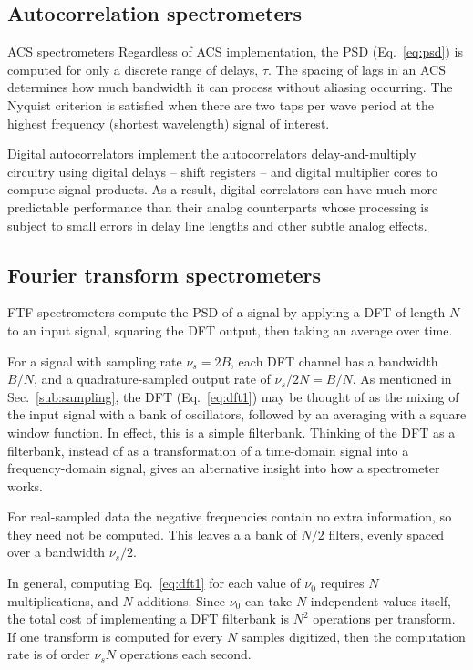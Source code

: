 \documentclass{ws-rv961x669}
\begin{document}
\subsection{Autocorrelation spectrometers}\label{sub:acs}

ACS spectrometers 
Regardless of ACS implementation, the PSD (Eq.~\ref{eq:psd}) is computed for only a discrete range of delays, $\tau$. The spacing of lags in an ACS determines how much bandwidth it can process without aliasing occurring. The Nyquist criterion is satisfied when there are two taps per wave period at the highest frequency (shortest wavelength) signal of interest. 


Digital autocorrelators implement the autocorrelators delay-and-multiply circuitry using digital delays -- shift registers -- and digital multiplier cores to compute signal products. As a result, digital correlators can have much more predictable performance than their analog counterparts whose processing is subject to small errors in delay line lengths and other subtle analog effects. 


\subsection{Fourier transform spectrometers}\label{sub:ftf}

FTF spectrometers compute the PSD of a signal by applying a DFT of length $N$ to an input signal, squaring the DFT output, then taking an average over time. 

For a signal with sampling rate $\nu_s=2B$, each DFT channel has a bandwidth $B/N$, and a quadrature-sampled output rate of $\nu_s/2N = B/N$. As mentioned in Sec.~\ref{sub:sampling}, the DFT (Eq.~\ref{eq:dft1}) may be thought of as the mixing of the input signal with a bank of oscillators, followed by an averaging with a square window function. In effect, this is a simple filterbank. Thinking of the DFT as a filterbank, instead of as a transformation of a time-domain signal into a frequency-domain signal, gives an alternative insight into how a spectrometer works.

For real-sampled data the negative frequencies contain no extra information, so they need not be computed. This leaves a a bank of $N/\mbox{2}$ filters, evenly spaced over a bandwidth $\nu_{s}/\mbox{2}$. 

In general, computing Eq.~\ref{eq:dft1} for each value of $\nu_0$ requires $N$ multiplications, and $N$ additions. Since $\nu_0$ can take $N$ independent values itself, the total cost of implementing a DFT filterbank is $N^2$ operations per transform. If one transform is computed for every $N$ samples digitized, then the computation rate is of order $\nu_sN$ operations each second. 
\end{document}
